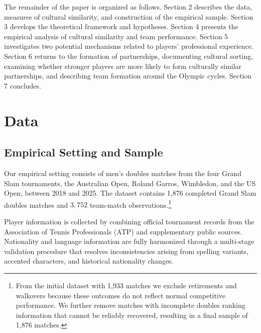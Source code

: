 \documentclass[10pt]{article}
\begin{document}
The remainder of the paper is organized as follows. Section 2 describes the data, measures of cultural similarity, and construction of the empirical sample. Section 3 develops the theoretical framework and hypotheses. Section 4 presents the empirical analysis of cultural similarity and team performance. Section 5 investigates two potential mechanisms related to players’ professional experience. Section 6 returns to the formation of partnerships, documenting cultural sorting, examining whether stronger players are more likely to form culturally similar partnerships, and describing team formation around the Olympic cycles. Section 7 concludes.
\section{Data}
\subsection{Empirical Setting and Sample}
Our empirical setting consists of men's doubles matches from the four Grand Slam tournaments, the Australian Open, Roland Garros, Wimbledon, and the US Open, between 2018 and 2025. The dataset contains 1,876 completed Grand Slam doubles matches and $3{,}752$ team-match observations.\footnote{From the initial dataset with 1,933  matches we exclude retirements and walkovers because these outcomes do not reflect normal competitive performance. We further remove matches with incomplete doubles ranking information that cannot be reliably recovered, resulting in a final  sample of 1,876 matches.} 

Player information is collected by combining official tournament records from the Association of Tennis Professionals (ATP)  and supplementary public sources. Nationality and language information are fully harmonized through a multi-stage validation procedure that resolves inconsistencies arising from spelling variants, accented characters, and historical nationality changes. %
\end{document}
